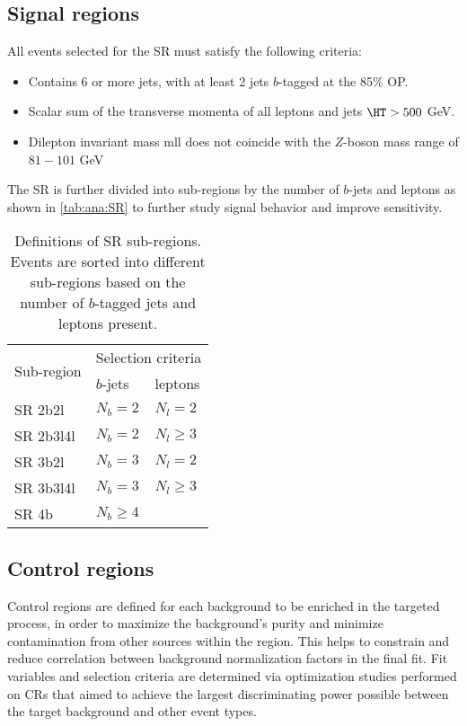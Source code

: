 \documentclass[../thesis.tex]{subfiles}
\begin{document}
\subsection{Signal regions}
All events selected for the \acs{SR} must satisfy the following criteria:
\begin{itemize}
\item Contains 6 or more jets, with at least 2 jets $b$-tagged at the 85\% \acs{OP}.
\item Scalar sum of the transverse momenta of all leptons and jets $\HT > 500$ GeV.
\item Dilepton invariant mass \acs{mll} does not coincide with the $Z$-boson mass range of $81-101$ GeV
\end{itemize}
The \acs{SR} is further divided into sub-regions by the number of $b$-jets and leptons as shown in \autoref{tab:ana:SR} to further study signal behavior and improve sensitivity.

\begin{table}[!ht]
\centering
\caption{\label{tab:ana:SR}Definitions of \acs{SR} sub-regions. Events are sorted into different sub-regions based on the number of $b$-tagged jets and leptons present.}%
\begin{tabular}{p{2cm}|p{3cm}l}
\toprule\toprule
\multicolumn{1}{c|}{\multirow{ 2}{*}{Sub-region}} & \multicolumn{2}{c}{Selection criteria} \\
\multicolumn{1}{c|}{}	& $b$-jets	& leptons \\
\midrule
SR 2b2l			& $N_b = 2$	& $N_l = 2$ \\
SR 2b3l4l		& $N_b = 2$	& $N_l \geq 3$ \\
SR 3b2l			& $N_b = 3$	& $N_l = 2$ \\
SR 3b3l4l		& $N_b = 3$	& $N_l \geq 3$ \\
SR 4b			& $N_b \geq 4$	& \\
\bottomrule\bottomrule
\end{tabular}
\end{table}

\subsection{Control regions}
Control regions are defined for each background to be enriched in the targeted process, in order to maximize the background's purity and minimize contamination from other sources within the region. This helps to constrain and reduce correlation between background normalization factors in the final fit. Fit variables and selection criteria are determined via optimization studies performed on \acs{CR}s that aimed to achieve the largest discriminating power possible between the target background and other event types.
\end{document}
